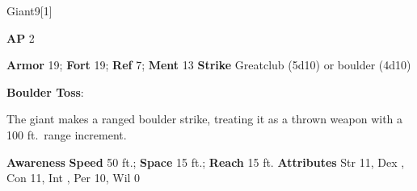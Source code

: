 \begin{monsection}[Stone]{Giant}{9}[1]
\vspace{-1em}\vspace{-1em}
\begin{spellcontent}
\begin{spelltargetinginfo}
{\textbf{AP} 2}

\pari \textbf{Armor} 19;
\textbf{Fort} 19;
\textbf{Ref} 7;
\textbf{Ment} 13
\pari \textbf{Strike} Greatclub  (5d10) or boulder  (4d10)



\end{spelltargetinginfo}


\begin{spelleffects}

\pari
\textbf{Boulder Toss}:

The giant makes a ranged boulder strike, treating it as a thrown weapon with a 100 ft.\ range increment.




\end{spelleffects}

\end{spellcontent}

\begin{monsterfooter}
\pari \textbf{Awareness} 
\pari \textbf{Speed} 50 ft.;
\textbf{Space} 15 ft.;
\textbf{Reach} 15 ft.
\pari \textbf{Attributes}
Str 11,
Dex ,
Con 11,
Int ,
Per 10,
Wil 0
\end{monsterfooter}
\end{monsection}



